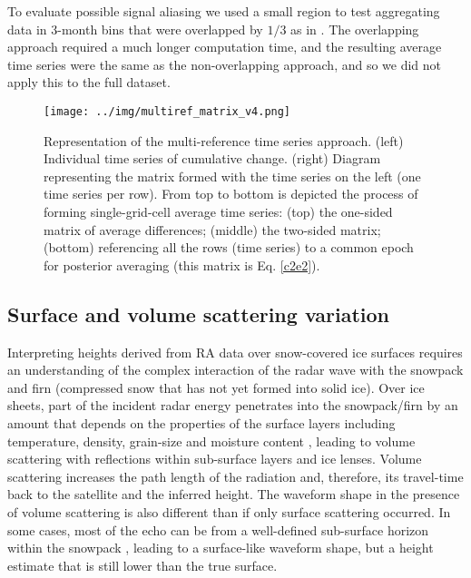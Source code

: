 To evaluate possible signal aliasing we used a small region to test aggregating data in 3-month bins that were overlapped by $1/3$ as in \textcite{Khvorostovsky2011}. The overlapping approach required a much longer computation time, and the resulting average time series were the same as the non-overlapping approach, and so we did not apply this to the full dataset.


\begin{figure}[!ht]
  \texttt{[image: ../img/multiref\_matrix\_v4.png]}
  \caption{
  Representation of the multi-reference time series approach. (left) Individual time series of cumulative change. (right) Diagram representing the matrix formed with the time series on the left (one time series per row). From top to bottom is depicted the process of forming single-grid-cell average time series: (top) the one-sided matrix of average differences; (middle) the two-sided matrix; (bottom) referencing all the rows (time series) to a common epoch for posterior averaging (this matrix is Eq. \ref{c2e2}).} 
  \label{c2f3}
\end{figure}

\subsection{Surface and volume scattering variation}

Interpreting heights derived from RA data over snow-covered ice surfaces requires an understanding of the complex interaction of the radar wave with the snowpack and firn (compressed snow that has not yet formed into solid ice). Over ice sheets, part of the incident radar energy penetrates into the snowpack/firn \parencite{Ridley1988} by an amount that depends on the properties of the surface layers including temperature, density, grain-size and moisture content \parencite{Davis1993}, leading to volume scattering with reflections within sub-surface layers and ice lenses. Volume scattering increases the path length of the radiation and, therefore, its travel-time back to the satellite and the inferred height. The waveform shape in the presence of volume scattering is also different than if only surface scattering occurred. In some cases, most of the echo can be from a well-defined sub-surface horizon within the snowpack \parencite{Thomas2008}, leading to a surface-like waveform shape, but a height estimate that is still lower than the true surface.

